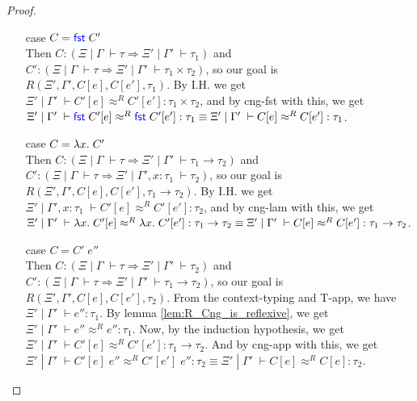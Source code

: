 \documentclass[a4paper, 11pt]{report}
\theoremstyle{definition}
\newcommand{\Keyword}[1]{{\color{blue} \mathsf{#1}}}
\newcommand{\var}{x}
\newcommand{\expr}{e}
\newcommand{\Fst}{\Keyword{fst}\;}
\newcommand{\Tvar}{X}
\newcommand{\Tlam}{\Lambda\;}
\newcommand{\ctx}{C}
\newcommand{\Tprod}[2]{#1 \times #2}
\newcommand{\Tfunc}[2]{#1 \rightarrow #2}
\newcommand{\Tall}[2]{\forall #1.\; #2}
\newcommand{\typ}{\tau}
\newcommand{\venv}{\Gamma}
\newcommand{\tenv}{\Xi}
\newcommand{\jdg}[4]{#1 \; | \; #2 \; \vdash #3 : #4}
\newcommand{\jdgType}[3]{#1 \; | \; #2 \; \vdash #3}
\newcommand{\jdgRel}[6]{#1 \; | \; #2 \; \vdash #3 \approx^{#4} #5 : #6}
\begin{document}
\begin{proof}
\begin{itemize}
    \item[case] $\ctx = \Fst \ctx'$\\
      Then $\ctx : (\jdgType{\tenv}{\venv}{\typ} \Rightarrow \jdgType{\tenv'}{\venv'}{\typ_1})$ and $\ctx' : (\jdgType{\tenv}{\venv}{\typ} \Rightarrow \jdgType{\tenv'}{\venv'}{\Tprod{\typ_1}{\typ_2}})$, so our goal is $R(\tenv', \venv', \ctx[\expr], \ctx[\expr'], \typ_1)$. By I.H. we get $\jdgRel{\tenv'}{\venv'}{\ctx'[\expr]}{R}{\ctx'[\expr']}{\Tprod{\typ_1}{\typ_2}}$, and by cng-fst with this, we get $\jdgRel{\tenv'}{\venv'}{\Fst \ctx'[\expr]}{R}{\Fst \ctx'[\expr']}{\typ_1} \equiv \jdgRel{\tenv'}{\venv'}{\ctx[\expr]}{R}{\ctx[\expr']}{\typ_1}$.
    \item[case] $\ctx = \fun \var . \ctx'$\\
      Then $\ctx : (\jdgType{\tenv}{\venv}{\typ} \Rightarrow \jdgType{\tenv'}{\venv'}{\Tfunc{\typ_1}{\typ_2}})$ and $\ctx' : (\jdgType{\tenv}{\venv}{\typ} \Rightarrow \jdgType{\tenv'}{\venv', x : \typ_1}{\typ_2})$, so our goal is $R(\tenv', \venv', \ctx[\expr], \ctx[\expr'], \Tfunc{\typ_1}{\typ_2})$. By I.H. we get $\jdgRel{\tenv'}{\venv', x : \typ_1}{\ctx'[\expr]}{R}{\ctx'[\expr']}{\typ_2}$, and by cng-lam with this, we get $\jdgRel{\tenv'}{\venv'}{\fun \var . \ctx'[\expr]}{R}{\fun \var . \ctx'[\expr']}{\Tfunc{\typ_1}{\typ_2}} \equiv \jdgRel{\tenv'}{\venv'}{\ctx[\expr]}{R}{\ctx[\expr']}{\Tfunc{\typ_1}{\typ_2}}$.
    \item[case] $\ctx = \ctx' \; \expr''$\\
      Then $\ctx : (\jdgType{\tenv}{\venv}{\typ} \Rightarrow \jdgType{\tenv'}{\venv'}{\typ_2})$ and $\ctx' : (\jdgType{\tenv}{\venv}{\typ} \Rightarrow \jdgType{\tenv'}{\venv'}{\Tfunc{\typ_1}{\typ_2}})$, so our goal is $R(\tenv', \venv', \ctx[\expr], \ctx[\expr'], \typ_2)$. From the context-typing and T-app, we have $\jdg{\tenv'}{\venv'}{\expr''}{\typ_1}$. By lemma \ref{lem:R_Cng_is_reflexive}, we get $\jdgRel{\tenv'}{\venv'}{\expr''}{R}{\expr''}{\typ_1}$. Now, by the induction hypothesis, we get $\jdgRel{\tenv'}{\venv'}{\ctx'[\expr]}{R}{\ctx'[\expr']}{\Tfunc{\typ_1}{\typ_2}}$. And by cng-app with this, we get $\jdgRel{\tenv'}{\venv'}{\ctx'[\expr] \; \expr''}{R}{\ctx'[\expr'] \; \expr''}{\typ_2} \equiv \jdgRel{\tenv'}{\venv'}{\ctx[\expr]}{R}{\ctx[\expr]}{\typ_2}$.
  \end{itemize}
\end{proof}
\end{document}
